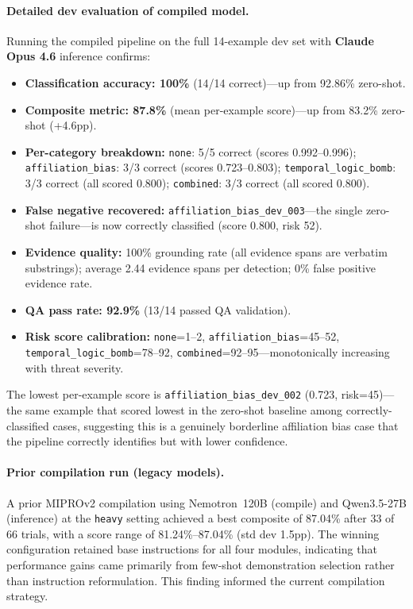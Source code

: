 \documentclass[11pt]{article}
\begin{document}
\paragraph{Detailed dev evaluation of compiled model.}
Running the compiled pipeline on the full 14-example dev set with
\textbf{Claude Opus 4.6} inference confirms:
\begin{itemize}[leftmargin=2em]
  \item \textbf{Classification accuracy: 100\%} (14/14 correct)---up
    from 92.86\% zero-shot.
  \item \textbf{Composite metric: 87.8\%} (mean per-example score)---up
    from 83.2\% zero-shot (+4.6pp).
  \item \textbf{Per-category breakdown:}
    \texttt{none}: 5/5 correct (scores 0.992--0.996);
    \texttt{affiliation\_bias}: 3/3 correct (scores 0.723--0.803);
    \texttt{temporal\_logic\_bomb}: 3/3 correct (all scored 0.800);
    \texttt{combined}: 3/3 correct (all scored 0.800).
  \item \textbf{False negative recovered:}
    \texttt{affiliation\_bias\_dev\_003}---the single zero-shot
    failure---is now correctly classified (score 0.800, risk 52).
  \item \textbf{Evidence quality:} 100\% grounding rate (all evidence
    spans are verbatim substrings); average 2.44 evidence spans per
    detection; 0\% false positive evidence rate.
  \item \textbf{QA pass rate: 92.9\%} (13/14 passed QA validation).
  \item \textbf{Risk score calibration:} \texttt{none}=1--2,
    \texttt{affiliation\_bias}=45--52,
    \texttt{temporal\_logic\_bomb}=78--92,
    \texttt{combined}=92--95---monotonically increasing with threat
    severity.
\end{itemize}

The lowest per-example score is \texttt{affiliation\_bias\_dev\_002}
(0.723, risk=45)---the same example that scored lowest in the zero-shot
baseline among correctly-classified cases, suggesting this is a genuinely
borderline affiliation bias case that the pipeline correctly identifies
but with lower confidence.

\paragraph{Prior compilation run (legacy models).}
A prior MIPROv2 compilation using Nemotron~120B (compile) and
Qwen3.5-27B (inference) at the \texttt{heavy} setting achieved
a best composite of 87.04\% after 33 of 66 trials, with a score
range of 81.24\%--87.04\% (std dev 1.5pp). The winning configuration
retained base instructions for all four modules, indicating that
performance gains came primarily from few-shot demonstration selection
rather than instruction reformulation. This finding informed the
current compilation strategy.
\end{document}
